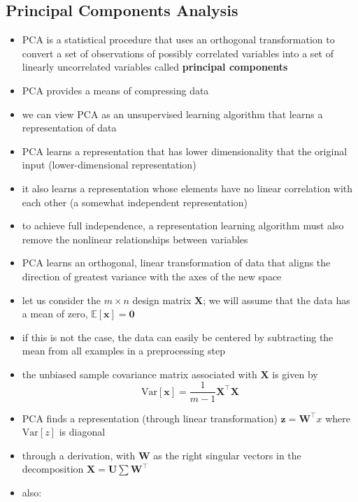 \documentclass[11pt, twocolumn]{report}
\def\expectation{\mathbb{E}}
\def\Var{\mathrm{Var}}
\begin{document}
\subsection{Principal Components Analysis}
\begin{itemize}
  \item PCA is a statistical procedure that uses an orthogonal transformation
    to convert a set of observations of possibly correlated variables into a
    set of linearly uncorrelated variables called \textbf{principal components} 
  \item PCA provides a means of compressing data
  \item we can view PCA as an unsupervised learning algorithm that learns a
    representation of data
  \item PCA learns a representation that has lower dimensionality that the
    original input (lower-dimensional representation)
  \item it also learns a representation whose elements have no linear
    correlation with each other (a somewhat independent representation)
  \item to achieve full independence, a representation learning algorithm must
    also remove the nonlinear relationships between variables
  \item PCA learns an orthogonal, linear transformation of data that aligns the
    direction of greatest variance with the axes of the new space
  \item let us consider the $m \times n$ design matrix $\bm{X}$; we will assume
    that the data has a mean of zero, $\expectation[\bm{x}] = \bm{0}$
  \item if this is not the case, the data can easily be centered by subtracting
    the mean from all examples in a preprocessing step
  \item the unbiased sample covariance matrix associated with $\bm{X}$ is given
    by
    \begin{equation}
      \Var[\bm{x}] = \frac{1}{m - 1} \bm{X}^\intercal \bm{X}
    \end{equation}
  \item PCA finds a representation (through linear transformation) $\bm{z} =
    \bm{W}^\intercal x$ where $\Var[z]$ is diagonal
  \item through a derivation, with $\bm{W}$ as the right singular vectors in
    the decomposition $\bm{X} = \bm{U}\sum\bm{W}^\intercal$
  \item also:
    \begin{equation}

\end{equation}
\end{itemize}
\end{document}
